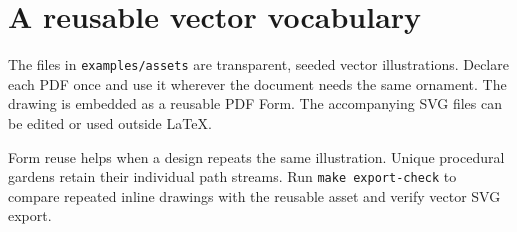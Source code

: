 \documentclass{article}
\begin{document}
\section*{A reusable vector vocabulary}
The files in \texttt{examples/assets} are transparent, seeded vector illustrations.
Declare each PDF once and use it wherever the document needs the same ornament.
The drawing is embedded as a reusable PDF Form. The accompanying SVG files can
be edited or used outside \LaTeX.

\noindent{}

\bigskip\noindent
{}

\bigskip
Form reuse helps when a design repeats the same illustration. Unique procedural
gardens retain their individual path streams. Run \texttt{make export-check} to
compare repeated inline drawings with the reusable asset and verify vector SVG
export.
\end{document}
